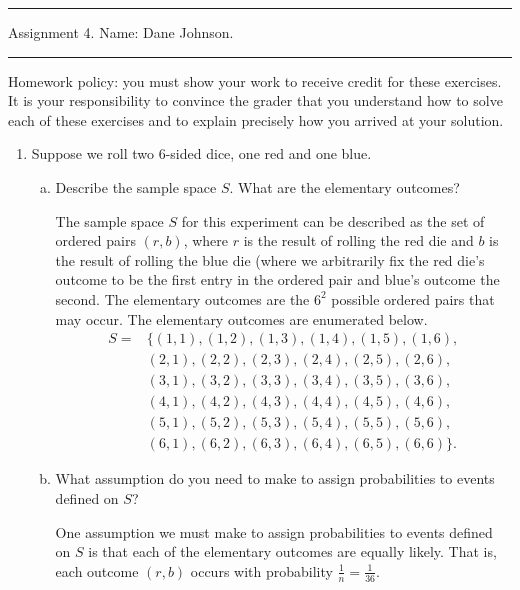 \documentclass[letterpaper,12pt,fleqn]{article}
\begin{document}
\pagestyle{empty}

\hrule \vspace{0.5em}
 \hfill Assignment 4. Name: Dane Johnson. \newline \hrule

\vspace{1em}

Homework policy: you must show your work to receive credit for these exercises.  It is your responsibility to convince the grader that you understand how to solve each of these exercises and to explain precisely how you arrived at your solution.

\vspace{1em}

\begin{enumerate}
\item Suppose we roll two $6$-sided dice, one red and one blue.

\begin{enumerate}[(a)]
\item Describe the sample space $S$. What are the elementary outcomes?

The sample space $S$ for this experiment can be described as the set of ordered pairs $(r, b)$, where $r$ is the result of rolling the red die and $b$ is the result of rolling the blue die (where we arbitrarily fix the red die's outcome to be the first entry in the ordered pair and blue's outcome the second. The elementary outcomes are the $6^2$ possible ordered pairs that may occur. The elementary outcomes are enumerated below.
\begin{align*} S = &\{(1,1), (1,2), (1,3), (1,4), (1,5),        (1,6), \\ & (2,1), (2,2), (2,3), (2,4), (2,5), (2,6), \\ & (3,1), (3,2), (3,3), (3,4), (3,5), (3,6), \\ &
		 (4,1), (4,2), (4,3), (4,4), (4,5), (4,6), \\ &
		 (5,1), (5,2), (5,3), (5,4), (5,5), (5,6), \\ &
		 (6,1), (6,2), (6,3), (6,4), (6,5), (6,6) \}.
\end{align*}


\item What assumption do you need to make to assign probabilities to events defined on $S$?

One assumption we must make to assign probabilities to events defined on $S$ is that each of the elementary outcomes are equally likely. That is, each outcome $(r,b)$ occurs with probability $\frac{1}{n} = \frac{1}{36}$.
\end{enumerate}


\end{enumerate}
\end{document}
